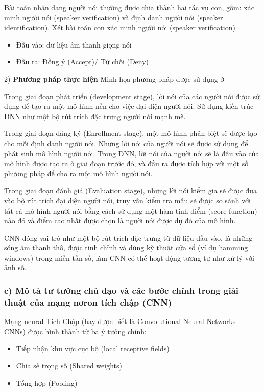 \documentclass{article}
\begin{document}
	Bài toán nhận dạng người nói thường được chia thành hai tác vụ con, gồm: xác minh người nói (speaker verification) và định danh người nói (speaker identification). Xét bài toán con xác minh người nói (speaker verification)
	\begin{itemize}
		\item Đầu vào: dữ liệu âm thanh giọng nói
		\item Đầu ra: Đồng ý (Accept)/ Từ chối (Deny)
	\end{itemize}
	2) \textbf{Phương pháp thực hiện}\newline
	Minh họa phương pháp được sử dụng ở \cite{Alzubaidi2021ReviewOD}
		
	Trong giai đoạn phát triển (development stage), lời nói của các người nói được sử dụng để tạo ra một mô hình nền cho việc đại diện người nói. Sử dụng kiến trúc DNN như một bộ rút trích đặc trưng người nói mạnh mẽ.
	
	Trong giai đoạn đăng ký (Enrollment stage), một mô hình phân biệt sẽ được tạo cho mỗi định danh người nói. Những lời nói của người nói sẽ được sử dụng để phát sinh mô hình người nói. Trong DNN, lời nói của người nói sẽ là đầu vào của mô hình được tạo ra ở giai đoạn trước đó, và đầu ra được tích hợp với một số phương pháp để cho ra một mô hình người nói.
	
	Trong giai đoạn đánh giá (Evaluation stage), những lời nói kiểm gia sẽ được đưa vào bộ rút trích đại diện người nói, truy vấn kiểm tra mẫu sẽ được so sánh với tất cả mô hình người nói bằng cách sử dụng một hàm tính điểm (score function) nào đó và điểm cao nhất được chọn là người nói được dự đó của mô hình.
	
	CNN đóng vai trò như một bộ rút trích đặc trưng từ dữ liệu đầu vào, là những sóng âm thanh thô, được tinh chỉnh và dùng kỹ thuật cửa sổ (ví dụ hamming windows) trong miền tần số, làm CNN có thể hoạt động tương tự như xử lý với ảnh số.
	
	\subsubsection{c) Mô tả tư tưởng chủ đạo và các bước chính trong giải thuật của mạng nơron tích chập (CNN)}
	
	Mạng neural Tích Chập (hay được biết là Convolutional Neural Networks - CNNs) được hình thành từ ba ý tưởng chính:
	\begin{itemize}
		\item Tiếp nhận khu vực cục bộ (local receptive fields)
		\item Chia sẻ trọng số (Shared weights)
		\item Tổng hợp (Pooling)
	\end{itemize}
\end{document}
